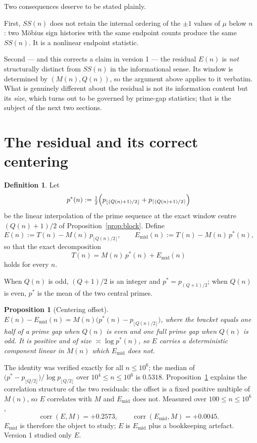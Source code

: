\documentclass[11pt]{amsart}
\newtheorem{proposition}[theorem]{Proposition}
\theoremstyle{definition}
\newtheorem{definition}[theorem]{Definition}
\newcommand{\mob}{\mu}
\newcommand{\Mert}{M}
\newcommand{\Sq}{Q}
\begin{document}
Two consequences deserve to be stated plainly.

First, $SS(n)$ does not retain the internal ordering of the $\pm1$ values of
$\mob$ below $n$: two M\"obius sign histories with the same endpoint counts
produce the same $SS(n)$. It is a nonlinear endpoint statistic.

Second --- and this corrects a claim in version 1 --- the residual $E(n)$ is
\emph{not} structurally distinct from $SS(n)$ in the informational sense. Its
window is determined by $(\Mert(n),\Sq(n))$, so the argument above applies to it
verbatim. What is genuinely different about the residual is not its information
content but its \emph{size}, which turns out to be governed by prime-gap
statistics; that is the subject of the next two sections.

\section{The residual and its correct centering}

\begin{definition}
Let
\[
p^{*}(n):=\tfrac12\Bigl(p_{\lfloor (\Sq(n)+1)/2\rfloor}+p_{\lceil (\Sq(n)+1)/2\rceil}\Bigr)
\]
be the linear interpolation of the prime sequence at the exact window centre
$(\Sq(n)+1)/2$ of Proposition~\ref{prop:block}. Define
\[
E(n):=T(n)-\Mert(n)\,p_{\lfloor \Sq(n)/2\rfloor},
\qquad
E_{\mathrm{mid}}(n):=T(n)-\Mert(n)\,p^{*}(n),
\]
so that the exact decomposition
\[
\boxed{\;T(n)=\Mert(n)\,p^{*}(n)+E_{\mathrm{mid}}(n)\;}
\]
holds for every $n$.
\end{definition}

When $\Sq(n)$ is odd, $(\Sq+1)/2$ is an integer and $p^{*}=p_{(\Sq+1)/2}$; when
$\Sq(n)$ is even, $p^{*}$ is the mean of the two central primes.

\begin{proposition}[Centering offset]\label{prop:offset}
$E(n)-E_{\mathrm{mid}}(n)=\Mert(n)\bigl(p^{*}(n)-p_{\lfloor \Sq(n)/2\rfloor}\bigr)$,
where the bracket equals one half of a prime gap when $\Sq(n)$ is even and one
full prime gap when $\Sq(n)$ is odd. It is positive and of size
$\asymp\log p^{*}(n)$, so $E$ carries a deterministic component linear in
$\Mert(n)$ which $E_{\mathrm{mid}}$ does not.
\end{proposition}

The identity was verified exactly for all $n\le10^{6}$; the median of
$\bigl(p^{*}-p_{\lfloor \Sq/2\rfloor}\bigr)/\log p_{\lfloor \Sq/2\rfloor}$ over
$10^{4}\le n\le10^{6}$ is $0.5318$. Proposition~\ref{prop:offset} explains the
correlation structure of the two residuals: the offset is a fixed positive
multiple of $\Mert(n)$, so $E$ correlates with $\Mert$ and $E_{\mathrm{mid}}$
does not. Measured over $100\le n\le10^{6}$,
\[
\operatorname{corr}(E,\Mert)=+0.2573,
\qquad
\operatorname{corr}(E_{\mathrm{mid}},\Mert)=+0.0045 .
\]
$E_{\mathrm{mid}}$ is therefore the object to study; $E$ is $E_{\mathrm{mid}}$
plus a bookkeeping artefact. Version 1 studied only $E$.
\end{document}
